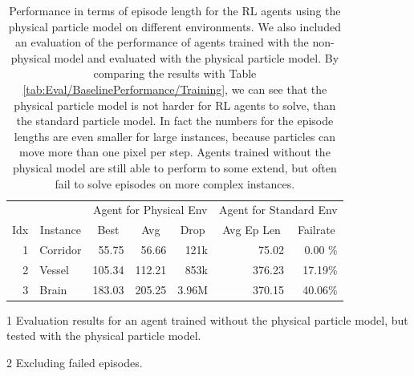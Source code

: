 \begin{table}[htp]
    \begin{center}
        \begin{threeparttable}
            \begin{tabular}{rlrrrrr}
                \toprule
                 &  & \multicolumn{3}{c}{Agent for Physical Env} & \multicolumn{2}{c}{Agent for Standard Env\tnote{1}} \\
                \cmidrule(lr){3-5} \cmidrule(lr){6-7}
                \multicolumn{1}{c}{Idx} & \multicolumn{1}{c}{Instance} & \multicolumn{1}{c}{Best} & \multicolumn{1}{c}{Avg} & \multicolumn{1}{c}{Drop} & \multicolumn{1}{c}{Avg Ep Len} & \multicolumn{1}{c}{Failrate} \\
                \midrule
                1 & Corridor & 55.75 & 56.66 & 121k & 75.02\tnote{2} & 0.00 \%\\
                2 & Vessel & 105.34 & 112.21 & 853k & 376.23\tnote{2} & 17.19\% \\
                3 & Brain & 183.03 & 205.25 & 3.96M & 370.15\tnote{2} & 40.06\% \\
                \bottomrule
            \end{tabular}
            \begin{tablenotes}
                \footnotesize
                \item[1] Evaluation results for an agent trained without the physical particle model, but tested with the physical particle model.
                \item[2] Excluding failed episodes.
            \end{tablenotes}
        \end{threeparttable}
        
    \end{center}
    \caption[Agent Performance on Environments with the Physical Particle Model]{Performance in terms of episode length for the RL agents using the physical particle model on different environments. We also included an evaluation of the performance of agents trained with the non-physical model and evaluated with the physical particle model. By comparing the results with Table \ref{tab:Eval/BaselinePerformance/Training}, we can see that the physical particle model is not harder for RL agents to solve, than the standard particle model. In fact the numbers for the episode lengths are even smaller for large instances, because particles can move more than one pixel per step. Agents trained without the physical model are still able to perform to some extend, but often fail to solve episodes on more complex instances.} \label{tab:Eval/Physical}
\end{table}

